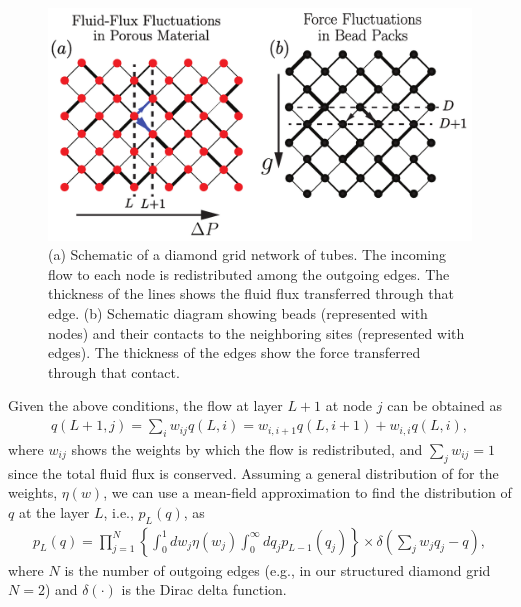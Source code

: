 \documentclass[%
reprint,
 amsmath,amssymb,
 aps,
prl,
]{revtex4-1}
\begin{document}
\begin{figure}[h]
  \centering
  \includegraphics[width=.75\textwidth]{FigS1.pdf} %
  \caption{(a) Schematic of a  diamond grid network of tubes. The incoming flow to each node is redistributed among the outgoing edges. The thickness of the lines shows the fluid flux transferred through that edge. (b) Schematic diagram showing beads (represented with nodes) and their contacts to the neighboring sites (represented with edges). The thickness of the edges show the force transferred through that contact.} \label{grid-result}
\end{figure}
%
Given the above conditions, the flow at layer $L+1$ at node $j$ can be obtained as 
%
\begin{align}
  q(L+1,j) = \sum_i w_{ij} q(L,i) = w_{i,i+1} q(L,i+1) + w_{i,i} q(L,i), \label{total-flow}
\end{align}
%
where $w_{ij}$ shows the weights by which the flow is redistributed, and $\sum_{j} w_{ij} = 1$ since the total fluid flux is conserved. 
%
%
Assuming a general distribution of for the weights, $\eta(w)$, we can use a mean-field approximation to find the distribution of $q$ at the layer $L$, i.e., $p_L(q)$, as 
\begin{align}
  p_L (q) = \prod_{j=1}^N \left\{ \int_0^1 d w_j \eta(w_j) \int_0^{\infty} dq_j p_{L-1}(q_j)\right\} \times \delta \left( \sum_j w_j q_{j} - q \right),
\end{align}
%
where $N$ is the number of outgoing edges (e.g., in our structured diamond grid $N=2$) and $\delta(\cdot)$ is the Dirac delta function. 
\end{document}
